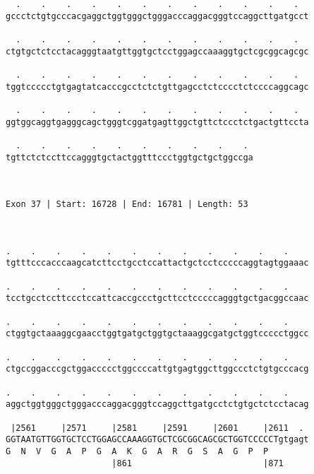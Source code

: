 \documentclass{article}
\begin{document}
\begin{Verbatim}
  .    .    .    .    .    .    .    .    .    .    .    .  
gccctctgtgcccacgaggctggtgggctgggacccaggacgggtccaggcttgatgcct
                                                            
  .    .    .    .    .    .    .    .    .    .    .    .  
ctgtgctctcctacagggtaatgttggtgctcctggagccaaaggtgctcgcggcagcgc
                                                            
  .    .    .    .    .    .    .    .    .    .    .    .  
tggtccccctgtgagtatcacccgcctctctgttgagcctctcccctctccccaggcagc
                                                            
  .    .    .    .    .    .    .    .    .    .    .    .  
ggtggcaggtgagggcagctgggtcggatgagttggctgttctccctctgactgttccta
                                                            
  .    .    .    .    .    .    .    .    .    . 
tgttctctccttccagggtgctactggtttccctggtgctgctggccga
                                                 
                                                 
 
Exon 37 | Start: 16728 | End: 16781 | Length: 53



.    .    .    .    .    .    .    .    .    .    .    .    
tgtttcccacccaagcatcttcctgcctccattactgctcctcccccaggtagtggaaac
                                                            
.    .    .    .    .    .    .    .    .    .    .    .    
tcctgcctccttccctccattcaccgccctgcttcctcccccagggtgctgacggccaac
                                                            
.    .    .    .    .    .    .    .    .    .    .    .    
ctggtgctaaaggcgaacctggtgatgctggtgctaaaggcgatgctggtccccctggcc
                                                            
.    .    .    .    .    .    .    .    .    .    .    .    
ctgccggacccgctggaccccctggccccattgtgagtggcttggccctctgtgcccacg
                                                            
.    .    .    .    .    .    .    .    .    .    .    .    
aggctggtgggctgggacccaggacgggtccaggcttgatgcctctgtgctctcctacag
                                                            
 |2561     |2571     |2581     |2591     |2601     |2611  . 
GGTAATGTTGGTGCTCCTGGAGCCAAAGGTGCTCGCGGCAGCGCTGGTCCCCCTgtgagt
G  N  V  G  A  P  G  A  K  G  A  R  G  S  A  G  P  P        
                     |861                          |871     
  

\end{Verbatim}
\end{document}
